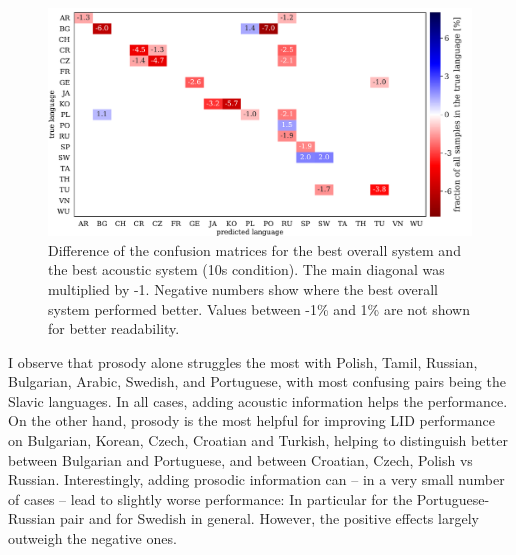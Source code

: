 \documentclass[bsc,frontabs,twoside,singlespacing,parskip,deptreport]{infthesis}
\begin{document}
{{\begin{figure}[h!t]
    \end{figure}
    \begin{figure}[h!t]
      \centering
      \includegraphics[width=\textwidth]{../img/diff_best_vs_mfcc_deltas.pdf}
      \caption{Difference of the confusion matrices for the best overall system and the best acoustic system (10s condition). The main diagonal was multiplied by -1. Negative numbers show where the best overall system performed better. Values between -1\% and 1\% are not shown for better readability.}
      \label{fig:cfmtrx-diff-best-vs-acoustic-10s}
    \end{figure}
    I observe that prosody alone struggles the most with Polish, Tamil, Russian, Bulgarian, Arabic, Swedish, and Portuguese, with most confusing pairs being the Slavic languages. In all cases, adding acoustic information helps the performance.
    On the other hand, prosody is the most helpful for improving LID performance on Bulgarian, Korean, Czech, Croatian and Turkish, helping to distinguish better between Bulgarian and Portuguese, and between Croatian, Czech, Polish vs Russian. Interestingly, adding prosodic information can -- in a very small number of cases -- lead to slightly worse performance: In particular for the Portuguese-Russian pair and for Swedish in general. However, the positive effects largely outweigh the negative ones.
  }

}
\end{document}
